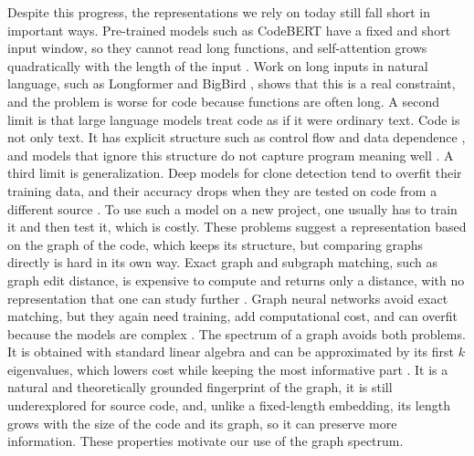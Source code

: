 \documentclass[authoryear,final,5p,times,twocolumn]{elsarticle}
\theoremstyle{plain}
\begin{document}
Despite this progress, the representations we rely on today still fall short
in important ways. Pre-trained models such as CodeBERT have a fixed and
short input window, so they cannot read long functions, and self-attention grows quadratically with
the length of the input \cite{feng2020codebert,vaswani2017attention}. Work
on long inputs in natural language, such as Longformer
\cite{beltagy2020longformer} and BigBird \cite{zaheer2020bigbird}, shows
that this is a real constraint, and the problem is worse for code because
functions are often long. A second limit is that large language models
treat code as if it were ordinary text. Code is not only text. It has
explicit structure such as control flow and data dependence
\cite{hindle2012naturalness,allamanis2018survey}, and models that ignore
this structure do not capture program meaning well
\cite{chen2021codex,dou2023llmsurvey}. A third limit is generalization.
Deep models for clone detection tend to overfit their training data, and
their accuracy drops when they are tested on code from a different source
\cite{sonnekalb2022generalizability}. To use such a model on a new project,
one usually has to train it and then test it, which is costly. These
problems suggest a representation based on the graph of the code, which
keeps its structure, but comparing graphs directly is hard in its own way.
Exact graph and subgraph matching, such as graph edit distance, is
expensive to compute and returns only a distance, with no representation
that one can study further \cite{komondoor2001slicing}. Graph neural
networks avoid exact matching, but they again need training, add
computational cost, and can overfit because the models are complex
\cite{kipf2017gcn,xu2019gin}. The spectrum of a graph avoids both problems.
It is obtained with standard linear algebra and can be approximated by its
first $k$ eigenvalues, which lowers cost while keeping the most informative
part \cite{chung1997spectral,defferrard2016cnngraph}. It is a natural and
theoretically grounded fingerprint of the graph, it is still underexplored
for source code, and, unlike a fixed-length embedding, its length grows
with the size of the code and its graph, so it can preserve more
information. These properties motivate our use of the graph spectrum.
\end{document}
